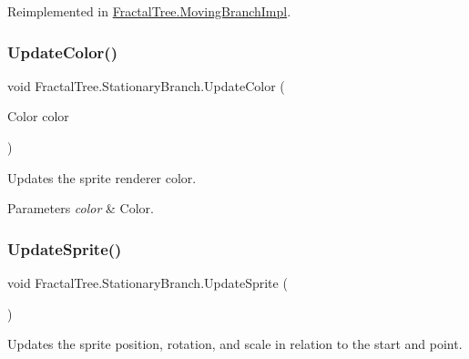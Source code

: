 Reimplemented in \hyperlink{class_fractal_tree_1_1_moving_branch_impl_a4e7cde65899abaf121a906d06874c330}{Fractal\+Tree.\+Moving\+Branch\+Impl}.

\hypertarget{class_fractal_tree_1_1_stationary_branch_ae80389d3859645e0023dd11533b06e83}{}\label{class_fractal_tree_1_1_stationary_branch_ae80389d3859645e0023dd11533b06e83} 
\subsubsection{\texorpdfstring{Update\+Color()}{UpdateColor()}}
{\footnotesize\ttfamily void Fractal\+Tree.\+Stationary\+Branch.\+Update\+Color (\begin{DoxyParamCaption}\item[{Color}]{color }\end{DoxyParamCaption})\hspace{0.3cm}{\ttfamily [protected]}}



Updates the sprite renderer color. 


\begin{DoxyParams}{Parameters}
{\em color} & Color.\\
\hline
\end{DoxyParams}
\hypertarget{class_fractal_tree_1_1_stationary_branch_a79b077e778c1d8aa92f3f4ad9a516058}{}\label{class_fractal_tree_1_1_stationary_branch_a79b077e778c1d8aa92f3f4ad9a516058} 
\subsubsection{\texorpdfstring{Update\+Sprite()}{UpdateSprite()}}
{\footnotesize\ttfamily void Fractal\+Tree.\+Stationary\+Branch.\+Update\+Sprite (\begin{DoxyParamCaption}{ }\end{DoxyParamCaption})\hspace{0.3cm}{\ttfamily [protected]}}



Updates the sprite position, rotation, and scale in relation to the start and point. 



